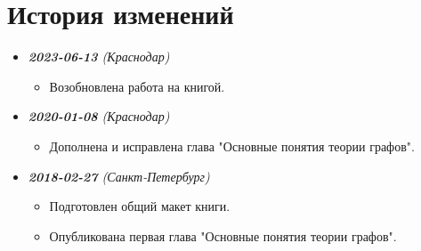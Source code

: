 
\chapter{История изменений}

\begin{itemize}
	\item \textit{\textbf{2023-06-13} (Краснодар)}
	\begin{itemize}
		\item Возобновлена работа на книгой.
	\end{itemize}

	\item \textit{\textbf{2020-01-08} (Краснодар)}
	\begin{itemize}
		\item Дополнена и исправлена глава "Основные понятия теории графов".
	\end{itemize}

	\item \textit{\textbf{2018-02-27} (Санкт-Петербург)}
	\begin{itemize}
		\item Подготовлен общий макет книги.
		\item Опубликована первая глава "Основные понятия теории графов".
	\end{itemize}
\end{itemize}